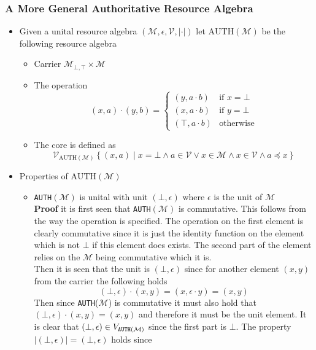 \subsubsection{A More General Authoritative Resource Algebra}
\begin{itemize}
  \item Given a unital resource algebra $(\mathcal M, \epsilon, \mathcal V, | \cdot |)$ let $\text{AUTH}(\mathcal M)$ be the following resource algebra
  \begin{itemize}
    \item Carrier $\mathcal M_{\bot, \top} \times \mathcal M$ 
    \item The operation 
    \[
      (x, a) \cdot (y, b) = 
      \begin{cases} 
        (y, a \cdot b) & \text{if } x = \bot \\
        (x, a \cdot b) & \text{if } y = \bot \\
        (\top, a \cdot b) & \text{otherwise}
      \end{cases}
    \]
    \item The core is defined as 
    \[
      \mathcal V_{\text{AUTH}(\mathcal M)} \left\{(x, a) \mid x = \bot \land a \in \mathcal V \lor x \in \mathcal M \land x \in \mathcal V \land a \preccurlyeq x \right\}
    \]
  \end{itemize}
  \item Properties of $\text{AUTH}(\mathcal M)$
  \begin{itemize}
    \item \texttt{AUTH}$(\mathcal M)$ is unital with unit $(\bot, \epsilon)$ where $\epsilon$ is the unit of $\mathcal M$ \smallskip \\
    \textbf{Proof} it is first seen that \texttt{AUTH}$(\mathcal M)$ is commutative. This follows from the way the operation is specified. The operation on the first element is clearly commutative since it is just the identity function on the element which is not $\bot$ if this element does exists. The second part of the element relies on the $\mathcal M$ being commutative which it is. \bigskip \\
Then it is seen that the unit is $(\bot, \epsilon)$ since for another element $(x,y)$ from the carrier the following holds
    \begin{equation*}
      (\bot, \epsilon) \cdot (x,y) = (x, \epsilon \cdot y) = (x,y)
    \end{equation*}
    Then since \texttt{AUTH}($\mathcal M$) is commutative it must also hold that $(\bot, \epsilon) \cdot (x,y) = (x,y)$ and therefore it must be the unit element. It is clear that $(\bot, \epsilon) \in \mathcal \mathcal V_{\mathtt{AUTH}(\mathcal M)}$ since the first part is $\bot$. The property $|(\bot, \epsilon)| = (\bot, \epsilon)$ holds since

\end{itemize}
\end{itemize}
